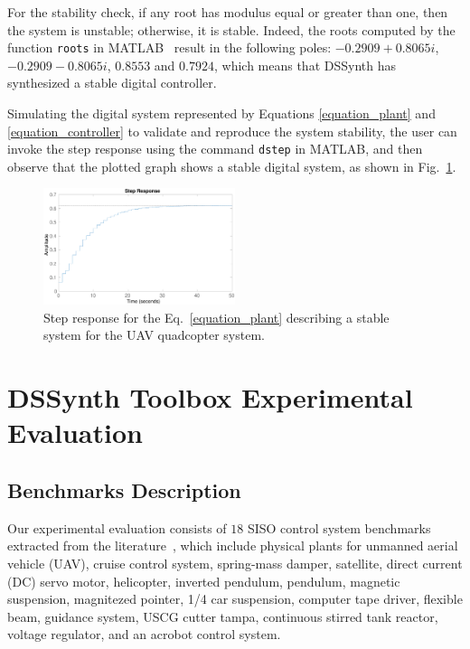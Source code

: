 \documentclass[10pt,conference]{IEEEtran}
\newcommand\tool{{DSSynth Toolbox}\xspace}
\begin{document}
For the stability check, if any root has modulus equal or greater than one, then the system is unstable; 
otherwise, it is stable. Indeed, the roots computed by the function \texttt{roots} 
in MATLAB~\cite{matlab-toolbox} result in the following poles: 
$-0.2909 + 0.8065i$, $-0.2909 - 0.8065i$, $0.8553$ and $0.7924$, 
which means that DSSynth has synthesized a stable digital controller.

Simulating the digital system represented by Equations \eqref{equation_plant} and \eqref{equation_controller} 
to validate and reproduce the system stability, the user can invoke the step response using the 
command \texttt{dstep} in MATLAB, and then observe that the plotted graph shows a stable digital system, 
as shown in Fig.~\ref{step-response}.
%
\begin{figure}[ht]
  \includegraphics[width=0.5\textwidth]{step-response.eps}
  \caption{Step response for the Eq.~\eqref{equation_plant} describing a stable system for the UAV quadcopter system.}
  \label{step-response}
\end{figure}

\section{\tool Experimental Evaluation}

\subsection{Benchmarks Description}
\label{benchmarks-description}

Our experimental evaluation consists of $18$ SISO control system benchmarks 
extracted from the literature~\cite{abate2017, abatecav2017,bouabdallah, acrobot,cstr,KOKOTOVIC198023,gajic2008optimal,Franklin15, maglev, converters, CTMS},
which include physical plants for unmanned aerial vehicle (UAV), cruise control system, 
spring-mass damper, satellite, direct current (DC) servo motor, helicopter, 
inverted pendulum, pendulum, magnetic suspension, magnitezed pointer, 1/4 car suspension, 
computer tape driver, flexible beam, guidance system, USCG cutter tampa, continuous stirred tank reactor, 
voltage regulator, and an acrobot control system.
\end{document}
